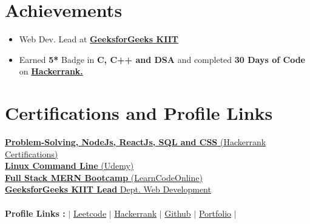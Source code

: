 \documentclass[letterpaper,11pt]{article}
\newcommand{\resumeItem}[2]{
  \item\small{
    \textbf{#1}{ #2 \vspace{-2pt}}
  }
}
\newcommand{\resumeSubHeadingListStart}{\begin{itemize}[leftmargin=*]}
\newcommand{\resumeSubHeadingListEnd}{\end{itemize}}
\newcommand{\resumeItemListStart}{\begin{itemize}}
\newcommand{\resumeItemListEnd}{\end{itemize}\vspace{-5pt}}
\begin{document}
\section{Achievements}
 \resumeSubHeadingListStart
    	\resumeItem{}{Web Dev. Lead at \href{https://gfgkiit.netlify.app/}{\bf GeeksforGeeks KIIT}}
    	
    	\resumeItem{}{Earned \textbf{5*} Badge in \textbf{C, C++ and DSA} and completed \textbf{30 Days of Code} on  {\href{https://www.hackerrank.com/satyajeetramnit1?hr_r=1}{\bf Hackerrank.}}}
 \resumeSubHeadingListEnd
 

\section{Certifications and Profile Links}
 \begin{itemize}[leftmargin=0.15in, label={}]
	\small{\item{
		\href{https://www.hackerrank.com/certificates/8c1ecb8ffd40}{\textbf{Problem-Solving, NodeJs, ReactJs, SQL and CSS} (Hackerrank Certifications)} \\
 	    \href{https://www.udemy.com/certificate/UC-ccf367dd-b692-405e-94c2-b67eeebd693d/}{\textbf{Linux Command Line} (Udemy)} \\
      \href{https://drive.google.com/file/d/16q_hy_uXJ3_Wx2DnA3NZALC5zqLaSTZs/view}{\textbf{Full Stack MERN Bootcamp} (LearnCodeOnline)} \\
 	    \href{https://drive.google.com/file/d/1TTGRI2AzBL_3gYKKtnOnh9yId2DWm_5P/view}{\textbf{GeeksforGeeks KIIT Lead}{ Dept. Web Development}} \\
 	    \  \ \\
 	    \textbf{Profile Links :}{ $|$ \href{https://leetcode.com/AnkitRajCodes/}{{Leetcode}} $|$ \href{https://www.hackerrank.com/AnkitRajCodes}{{Hackerrank}} $|$ \href{https://github.com/AnkitRajCode}{{Github}} $|$ \href{https://ankitraj.pages.dev}{{Portfolio}} $|$} \\
	}}
 \end{itemize}
 \vspace{-16pt}
 
\end{document}
